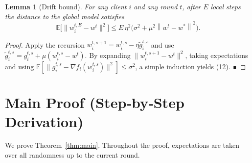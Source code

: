 \documentclass{article}
\newtheorem{lemma}{Lemma}
\newcommand{\E}{\mathbb{E}}
\newcommand{\norm}[1]{\left\lVert#1\right\rVert}
\begin{document}
\begin{lemma}[Drift bound]\label{lem:drift}
For any client $i$ and any round $t$, after $E$ local steps the distance to the global model satisfies
\[
\E\!\bigl[\|w_{i}^{t,E}-w^{t}\|^{2}\bigr]\le
E\,\eta^{2}\bigl(\sigma^{2}+ \mu^{2}\norm{w^{t}-w^{*}}^{2}\bigr).
\tag{12}
\]
\end{lemma}
\begin{proof}
Apply the recursion $w_{i}^{t,s+1}=w_{i}^{t,s}-\eta\tilde g_{i}^{t,s}$ and use
$\tilde g_{i}^{t,s}=g_{i}^{t,s}+\mu(w_{i}^{t,s}-w^{t})$.
By expanding $\|w_{i}^{t,s+1}-w^{t}\|^{2}$, taking expectations and using $\E[\|g_{i}^{t,s}-\nabla f_i(w_{i}^{t,s})\|^{2}]\le\sigma^{2}$,
a simple induction yields (12).  ∎
\end{proof}

\section*{Main Proof (Step‑by‑Step Derivation)}
We prove Theorem~\ref{thm:main}.  Throughout the proof, expectations are taken over all randomness up to the current round.
\end{document}
